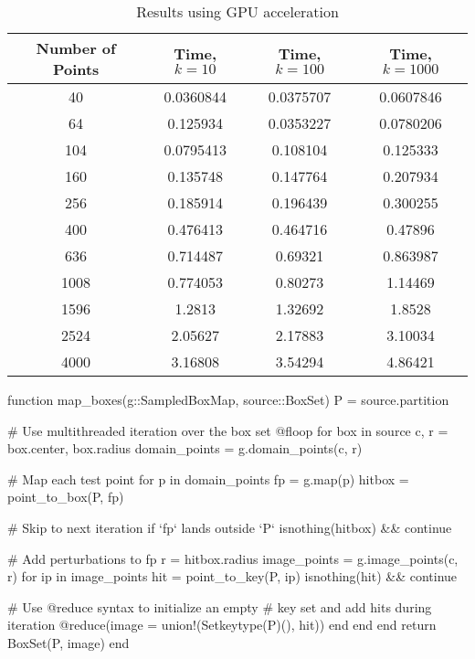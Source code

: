 \begin{table}[ht!]
    \centering
    {\footnotesize
        \begin{tabular}{| c | c c c |}
            \hline
            Number of Points & Time, $k=10$ & Time, $k=100$ & Time, $k=1000$ \\
            \hline
            40  &  0.0360844   &  0.0375707    &  0.0607846 \\
            64  &  0.125934    &  0.0353227    &  0.0780206 \\
            104  &  0.0795413   &  0.108104     &  0.125333 \\
            160  &  0.135748    &  0.147764     &  0.207934 \\
            256  &  0.185914    &  0.196439     &  0.300255 \\
            400  &  0.476413    &  0.464716     &  0.47896 \\
            636  &  0.714487    &  0.69321      &  0.863987 \\ 
            1008  &  0.774053    &  0.80273      &  1.14469 \\ 
            1596  &  1.2813      &  1.32692      &  1.8528 \\
            2524  &  2.05627     &  2.17883      &  3.10034 \\
            4000  &  3.16808     &  3.54294      &  4.86421 \\
            \hline
        \end{tabular}
    }
    \caption{Results using GPU acceleration}
    \label{tb:gpu}
\end{table}

\clearpage

\begin{jllisting}[float, floatplacement=hb!, language=julia, style=jlcodestyle, label=lst:boxmap, caption=Function to calculate $f(\mathcal{B})$]
    function map_boxes(g::SampledBoxMap, source::BoxSet)
        P = source.partition

        # Use multithreaded iteration over the box set
        @floop for box in source
            c, r = box.center, box.radius
            domain_points = g.domain_points(c, r)
            
            # Map each test point
            for p in domain_points
            fp = g.map(p)
            hitbox = point_to_box(P, fp)

            # Skip to next iteration if `fp` lands outside `P`
            isnothing(hitbox) && continue

                # Add perturbations to fp
                r = hitbox.radius
                image_points = g.image_points(c, r)
                for ip in image_points
                hit = point_to_key(P, ip)
                isnothing(hit) && continue
                
                # Use @reduce syntax to initialize an empty
                # key set and add hits during iteration
                @reduce(image = union!(Set{keytype(P)}(), hit))
                end
            end
        end
        return BoxSet(P, image)
    end 
\end{jllisting}

